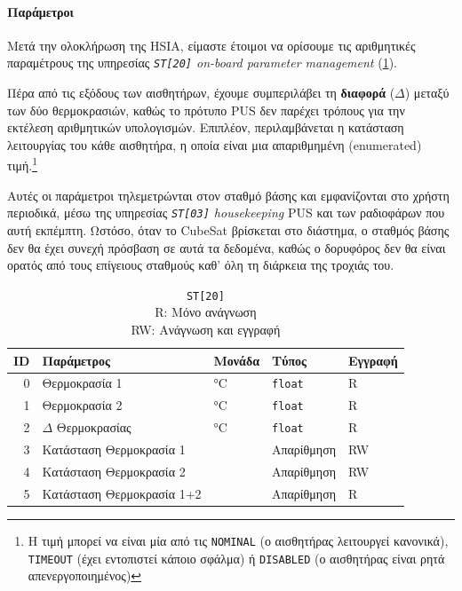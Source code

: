 \documentclass[a4paper,nobib]{tufte-book}
\begin{document}

\paragraph{Παράμετροι}

Μετά την ολοκλήρωση της \acl{HSIA}, είμαστε έτοιμοι να ορίσουμε τις αριθμητικές παραμέτρους της υπηρεσίας \emph{\texttt{ST[20]} on-board parameter management} \autocite{ECSS-E-ST-70-41C} (\cref{tab:demo_params}).

Πέρα από τις εξόδους των αισθητήρων, έχουμε συμπεριλάβει τη \textbf{διαφορά} (\(\Delta\)) μεταξύ των δύο θερμοκρασιών, καθώς το πρότυπο \acs{PUS} δεν παρέχει τρόπους για την εκτέλεση αριθμητικών υπολογισμών. Επιπλέον, περιλαμβάνεται η κατάσταση λειτουργίας του κάθε αισθητήρα, η οποία είναι μια απαριθμημένη (enumerated) τιμή.\footnote{Η τιμή μπορεί να είναι μία από τις \texttt{NOMINAL} (ο αισθητήρας λειτουργεί κανονικά), \texttt{TIMEOUT} (έχει εντοπιστεί κάποιο σφάλμα) ή \texttt{DISABLED} (ο αισθητήρας είναι ρητά απενεργοποιημένος)} 

Αυτές οι παράμετροι τηλεμετρώνται στον σταθμό βάσης και εμφανίζονται στο χρήστη περιοδικά, μέσω της υπηρεσίας \emph{\texttt{ST[03]} housekeeping} \ac{PUS} και των ραδιοφάρων που αυτή εκπέμπτη. Ωστόσο, όταν το CubeSat βρίσκεται στο διάστημα, ο σταθμός βάσης δεν θα έχει συνεχή πρόσβαση σε αυτά τα δεδομένα, καθώς ο δορυφόρος δεν θα είναι ορατός από τους επίγειους σταθμούς καθ' όλη τη διάρκεια της τροχιάς του.

\begin{table}[h]
	\centering
	\caption[Λίστα παραμέτρων \texttt{ST[20]}]{ \texttt{ST[20]}\\R: Μόνο ανάγνωση\\RW: Ανάγνωση και εγγραφή}
	\label{tab:demo_params}
	\begin{tabularx}{\textwidth}{@{}rXlll@{}}
		\toprule
		ID & Παράμετρος              & Μονάδα & Τύπος & Εγγραφή \\ \midrule
		0            & Θερμοκρασία 1          & \si{\celsius}      & \texttt{float} & R     \\
		1            & Θερμοκρασία 2          & \si{\celsius}      & \texttt{float} & R    \\
		2            & \(\Delta\) Θερμοκρασίας & \si{\celsius}      & \texttt{float} & R    \\
		3            & Κατάσταση Θερμοκρασία 1         &       & Απαρίθμηση   & RW  \\
		4            & Κατάσταση Θερμοκρασία 2         &       & Απαρίθμηση   & RW  \\
		5			 & Κατάσταση Θερμοκρασία 1+2       &		& Απαρίθμηση   & R  \\ \bottomrule
	\end{tabularx}
\end{table}
\end{document}
